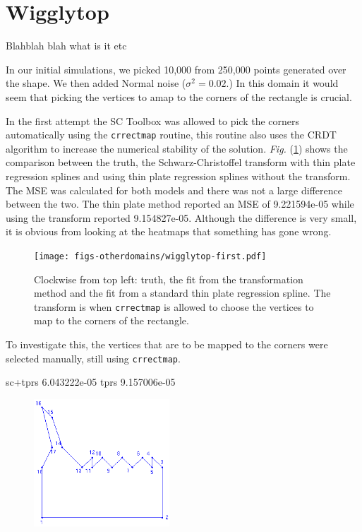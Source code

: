 \documentclass[a4paper,10pt]{amsart}
\newcommand{\sch}{Schwarz-Christoffel }
\newcommand{\Fig}[1]{\emph{Fig.} (\ref{#1})}
\begin{document}
\section{Wigglytop}


Blahblah blah what is it etc

In our initial simulations, we picked 10,000 from 250,000 points generated over the shape. We then added Normal noise ($\sigma^2=0.02$.) In this domain it would seem that picking the vertices to amap to the corners of the rectangle is crucial.

In the first attempt the SC Toolbox was allowed to pick the corners automatically using the \texttt{crrectmap} routine, this routine also uses the CRDT algorithm to increase the numerical stability of the solution. \Fig{wigglyfirstcomp} shows the comparison between the truth, the \sch transform with thin plate regression splines and using thin plate regression splines without the transform. The MSE was calculated for both models and there was not a large difference between the two. The thin plate method reported an MSE of 9.221594e-05 while using the transform reported 9.154827e-05. Although the difference is very small, it is obvious from looking at the heatmaps that something has gone wrong.

\begin{figure}
\centering
\texttt{[image: figs-otherdomains/wigglytop-first.pdf]} \\
\caption{Clockwise from top left: truth, the fit from the transformation method and the fit from a standard thin plate regression spline. The transform is when \texttt{crrectmap} is allowed to choose the vertices to map to the corners of the rectangle.}
\label{wigglyfirstcomp}
\end{figure}

To investigate this, the vertices that are to be mapped to the corners were selected manually, still using \texttt{crrectmap}. 

sc+tprs 6.043222e-05 
tprs 9.157006e-05 

\begin{figure}
\centering
\includegraphics[width=2in]{figs-otherdomains/wigglytop-numbered.png} \\
\caption{}
\label{wigglynumbered}
\end{figure}
\end{document}
